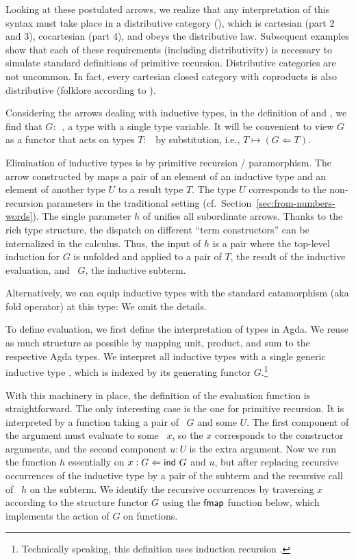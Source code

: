 \documentclass{jfp}
\begin{document}
Looking at these postulated arrows, we realize that any interpretation
of this syntax must take place in a distributive category
(\cite{cockett_1993}), which is  cartesian (part 2 and 3), cocartesian
(part 4), and obeys the distributive law. Subsequent examples show
that each of these requirements (including distributivity) is
necessary to simulate standard definitions of primitive recursion. 
Distributive categories are not uncommon. In fact, every cartesian
closed category with coproducts is also distributive (folklore
according to \cite{https://doi.org/10.48550/arxiv.1406.0961}).

Considering the arrows dealing with inductive types, 
in the definition of {\Afold} and {\AP}, we find that $G :$~, a type with a
single type variable. It will be convenient to view $G$ as a functor
that acts on types $T:$~{\ATY} by substitution, i.e., $T \mapsto (G
\Leftarrow T)$. 

Elimination of inductive types is by primitive recursion /
paramorphism. The arrow constructed by {\AP} maps a pair of an element
of an inductive type and an element of another type $U$ to a result type
$T$. The type $U$ corresponds to the non-recursion parameters in the
traditional setting (cf.\ Section~\ref{sec:from-numbers-words}). 
The single parameter $h$ of {\AP} unifies all subordinate
arrows. Thanks to the rich type structure, the dispatch on different
``term constructors'' can be internalized in the calculus. Thus, the
input of $h$ is a pair where the top-level induction for $G$ is
unfolded and applied to a pair of $T$, the result of the inductive
evaluation, and \Aind~$G$, the inductive subterm.

Alternatively, we can equip inductive types with the standard
catamorphism (aka fold operator) at this type:
\ccDataPRF
We omit the details.

To define evaluation, we first define the interpretation of types in Agda.
\ccDataAlg
We reuse as much structure as possible by mapping unit, product, and
sum to the respective Agda types. We interpret all inductive types with a
single generic inductive type , which is indexed by its generating
functor $G$.\footnote{Technically speaking, this definition uses
  induction recursion \cite{DBLP:journals/apal/DybjerS03}.}

With this machinery in place, the definition of the evaluation
function is straightforward.
\ccFunEval
The only interesting case is the one for primitive recursion. It is
interpreted by a function taking a pair of \Aind~$G$ and some $U$. The
first component of the argument must evaluate to some \Afold~$x$, so the $x$ corresponds
to the constructor arguments, and the second component $u:U$ is the
extra argument. Now we run the function $h$ essentially on
$x :{} G \Leftarrow \Aind~G$ and $u$, but 
after replacing recursive occurrences of the inductive type by a pair
of the subterm and the recursive call of {\AP}~$h$ on the subterm. We
identify the recursive occurrences by traversing $x$ according to the
structure functor $G$ using the $\Afmap$ function below, which
implements the action of $G$ on functions. 
\ccFunFmap
\end{document}
